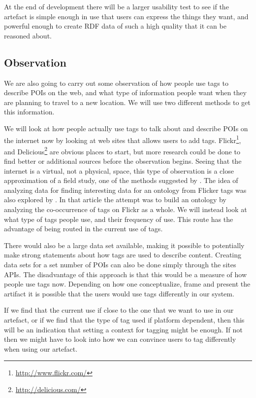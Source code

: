 At the end of development there will be a larger usability test to see if the artefact is simple enough in use that
users can express the things they want, and powerful enough to create RDF data of such a high quality that it can be reasoned about.


\subsection{Observation}
We are also going to carry out some observation of how people use tags to describe POIs on the web, and what type of information people want when they are planning to travel to a new location.
We will use two different methods to get this information.

We will look at how people actually use tags to talk about and describe POIs on the internet now by looking at web sites that allows users to add tags. 
Flickr\footnote{\url{http://www.flickr.com/}}, and Delicious\footnote{\url{http://delicious.com/}} are obvious places to start, 
but more research could be done to find better or additional sources before the observation begins.
Seeing that the internet is a virtual, not a physical, space, this type of observation is a close approximation of a field study, one of the methods suggested by \citet{Chen1990}.
The idea of analyzing data for finding interesting data for an ontology from Flicker tags was also explored by \citet{Schmitz2006}. 
In that article the attempt was to build an ontology by analyzing the co-occurrence of tags on Flickr as a whole. 
We will instead look at what type of tags people use, and their frequency of use.
This route has the advantage of being routed in the current use of tags. 

There would also be a large data set available, making it possible to potentially make strong statements about how tags are used to describe content.
Creating data sets for a set number of POIs can also be done simply through the sites APIs.
The disadvantage of this approach is that this would be a measure of how people use tags now. 
Depending on how one conceptualize, frame and present the artifact it is possible that the users would use tags differently in our system.

If we find that the current use if close to the one that we want to use in our artefact, 
or if we find that the type of tag used if platform dependent, 
then this will be an indication that setting a context for tagging might be enough.
If not then we might have to look into how we can convince users to tag differently when using our artefact.


